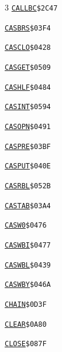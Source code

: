 \begin{multicols}{3}
\noindent\hyperlink{l:CALLBC}{\texttt{CALLBC}}\hfill\texttt{\$2C47~\phantom{000}\llap{\pageref{l:CALLBC}}}\par
\noindent\hyperlink{l:CASBRS}{\texttt{CASBRS}}\hfill\texttt{\$03F4~\phantom{000}\llap{\pageref{l:CASBRS}}}\par
\noindent\hyperlink{l:CASCLO}{\texttt{CASCLO}}\hfill\texttt{\$0428~\phantom{000}\llap{\pageref{l:CASCLO}}}\par
\noindent\hyperlink{l:CASGET}{\texttt{CASGET}}\hfill\texttt{\$0509~\phantom{000}\llap{\pageref{l:CASGET}}}\par
\noindent\hyperlink{l:CASHLF}{\texttt{CASHLF}}\hfill\texttt{\$0484~\phantom{000}\llap{\pageref{l:CASHLF}}}\par
\noindent\hyperlink{l:CASINT}{\texttt{CASINT}}\hfill\texttt{\$0594~\phantom{000}\llap{\pageref{l:CASINT}}}\par
\noindent\hyperlink{l:CASOPN}{\texttt{CASOPN}}\hfill\texttt{\$0491~\phantom{000}\llap{\pageref{l:CASOPN}}}\par
\noindent\hyperlink{l:CASPRE}{\texttt{CASPRE}}\hfill\texttt{\$03BF~\phantom{000}\llap{\pageref{l:CASPRE}}}\par
\noindent\hyperlink{l:CASPUT}{\texttt{CASPUT}}\hfill\texttt{\$040E~\phantom{000}\llap{\pageref{l:CASPUT}}}\par
\noindent\hyperlink{l:CASRBL}{\texttt{CASRBL}}\hfill\texttt{\$052B~\phantom{000}\llap{\pageref{l:CASRBL}}}\par
\noindent\hyperlink{l:CASTAB}{\texttt{CASTAB}}\hfill\texttt{\$03A4~\phantom{000}\llap{\pageref{l:CASTAB}}}\par
\noindent\hyperlink{l:CASW0}{\texttt{CASW0}}\hfill\texttt{\$0476~\phantom{000}\llap{\pageref{l:CASW0}}}\par
\noindent\hyperlink{l:CASWBI}{\texttt{CASWBI}}\hfill\texttt{\$0477~\phantom{000}\llap{\pageref{l:CASWBI}}}\par
\noindent\hyperlink{l:CASWBL}{\texttt{CASWBL}}\hfill\texttt{\$0439~\phantom{000}\llap{\pageref{l:CASWBL}}}\par
\noindent\hyperlink{l:CASWBY}{\texttt{CASWBY}}\hfill\texttt{\$046A~\phantom{000}\llap{\pageref{l:CASWBY}}}\par
\noindent\hyperlink{l:CHAIN}{\texttt{CHAIN}}\hfill\texttt{\$0D3F~\phantom{000}\llap{\pageref{l:CHAIN}}}\par
\noindent\hyperlink{l:CLEAR}{\texttt{CLEAR}}\hfill\texttt{\$0A80~\phantom{000}\llap{\pageref{l:CLEAR}}}\par
\noindent\hyperlink{l:CLOSE}{\texttt{CLOSE}}\hfill\texttt{\$087F~\phantom{000}\llap{\pageref{l:CLOSE}}}\par

\end{multicols}
